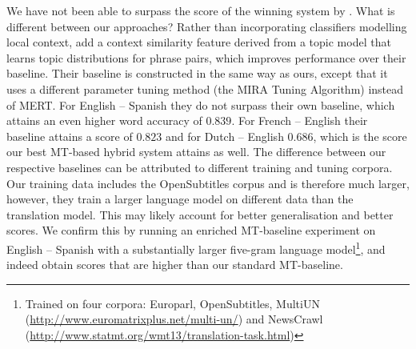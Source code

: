 \begin{table}[htb]
\caption{Highest word accuracy per team, per language pair. The best score for each language-pair is marked in bold.}
\label{tab:comparison}
\noindent{}
\end{table}

We have not been able to surpass the score of the winning system by
\cite{UEDIN}. What is different between our approaches? Rather than
incorporating classifiers modelling local context, \cite{UEDIN} add a context
similarity feature derived from a topic model that learns topic distributions
for phrase pairs, which improves performance over their baseline. Their
baseline is constructed in the same way as ours, except that it uses a
different parameter tuning method (the MIRA Tuning Algorithm) instead of MERT.
For English -- Spanish they do not surpass their own baseline, which attains an
even higher word accuracy of $0.839$. For French -- English their baseline
attains a score of $0.823$ and for Dutch -- English $0.686$, which is the score
our best MT-based hybrid system attains as well. The difference between our respective
baselines can be attributed to different training and tuning corpora.  Our
training data includes the OpenSubtitles corpus and is therefore much
larger, however, they train a larger language model on different data than the
translation model. This may likely account for better generalisation and better
scores. We confirm this by running an enriched MT-baseline experiment on
English -- Spanish with a substantially larger five-gram language
model\footnote{Trained on four corpora: Europarl, OpenSubtitles, MultiUN
(\url{http://www.euromatrixplus.net/multi-un/}) and NewsCrawl
(\url{http://www.statmt.org/wmt13/translation-task.html})}, and indeed
obtain scores that are higher than our standard MT-baseline.

